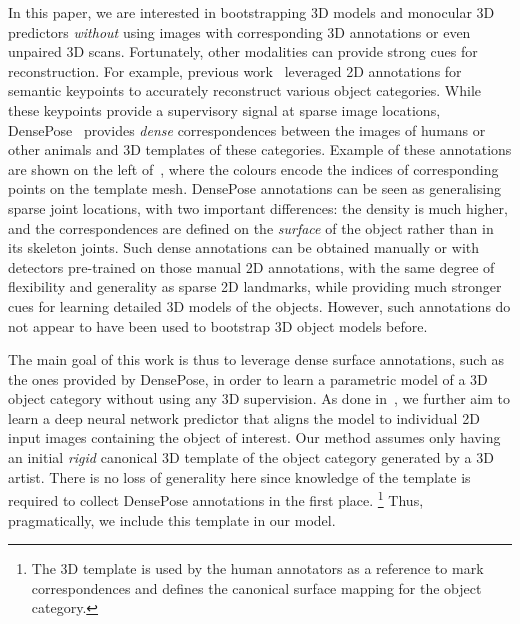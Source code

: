 In this paper, we are interested in bootstrapping 3D models and monocular 3D predictors \emph{without} using images with corresponding 3D annotations or even unpaired 3D scans.
Fortunately, other modalities can provide strong cues for reconstruction.
For example, previous work~\cite{Kanazawa2018,novotny19c3dpo,kong2019deep,chen2019learning} leveraged 2D annotations for semantic keypoints to accurately reconstruct various object categories.
While these keypoints provide a supervisory signal at sparse image locations, DensePose~\cite{guler18densepose:,neverova2020continuous,sanakoyeu2020transferring} provides \emph{dense} correspondences between the images of humans or other animals and 3D templates of these categories.
Example of these annotations are shown on the left of~, where the colours encode the indices of corresponding points on the template mesh.
DensePose annotations can be seen as generalising sparse joint locations, with two important differences:
the density is much higher, and the correspondences are defined on the \emph{surface} of the object rather than in its skeleton joints.
Such dense annotations can be obtained manually or with detectors pre-trained on those manual 2D annotations, with the same degree of flexibility and generality as sparse 2D landmarks, while providing much stronger cues for learning detailed 3D models of the objects.
However, such annotations do not appear to have been used to bootstrap 3D object models before.

The main goal of this work is thus to leverage dense surface annotations, such as the ones provided by DensePose, in order to learn a parametric model of a 3D object category without using any 3D supervision.
As done in~\cite{Kanazawa2018,novotny19c3dpo,kong2019deep,chen2019learning}, we further aim to learn a deep neural network predictor that aligns the model to individual 2D input images containing the object of interest.
Our method assumes only having an initial \textit{rigid} canonical 3D template of the object category generated by a 3D artist.
There is no loss of generality here since knowledge of the template is required to collect DensePose annotations in the first place.%
\footnote{The 3D template is used by the human annotators as a reference to mark correspondences and defines the canonical surface mapping for the object category.}
Thus, pragmatically, we include this template in our model.

